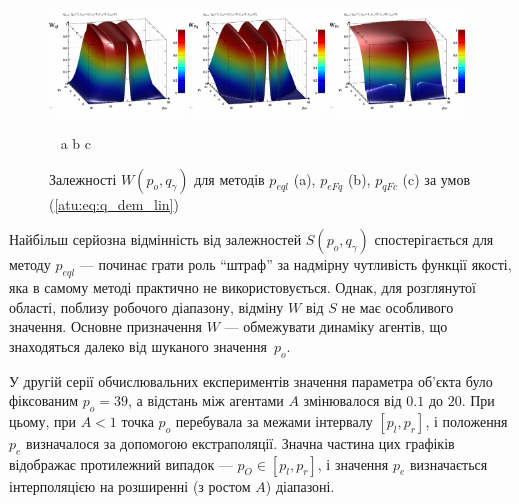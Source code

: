 \begin{figure}[htb!]
  \begin{center}
    \includegraphics[width=0.32\textwidth]{p/qls_pe-p_po_qg_Wql_lin.png}
    \hfill
    \includegraphics[width=0.32\textwidth]{p/qls_pe-p_po_qg_WFq_lin.png}
    \hfill
    \includegraphics[width=0.32\textwidth]{p/qls_pe-p_po_qg_WFc_lin.png}
  \end{center}
  \vspace{-1.0ex}
  \begin{center}
    ~ \hfill a \hfill\hfill b \hfill\hfill c \hfill ~
  \end{center}
  \vspace{-2.0ex}
  \caption{Залежності $W(p_o,q_\gamma)$ для методів $p_{eql}$ (a), $p_{eFq}$ (b), $p_{qFc}$ (c) за умов (\ref{atu:eq:q_dem_lin})}
  \label{atu:f:qsl_W_po_qg_lin}
\end{figure}

Найбільш серйозна відмінність від залежностей
$ S (p_o, q_\gamma) $ спостерігається для методу
$ p_{eql} $ --- починає грати роль ``штраф'' за надмірну
чутливість функції якості, яка в самому методі практично не
використовується. Однак, для розглянутої області, поблизу
робочого діапазону, відміну
$ W $ від
$ S $ не має особливого значення. Основне призначення
$ W $ --- обмежувати динаміку агентів, що знаходяться далеко від
шуканого значення~$p_o$.


У другій серії обчислювальних експериментів значення параметра об'єкта було
фіксованим $p_o = 39$, а відстань між агентами $A$ змінювалося від $0.1$
до $20$. При цьому, при $A <1$ точка $p_o$ перебувала за межами інтервалу
$[p_l, p_r]$, і положення $p_e$ визначалося за допомогою екстраполяції.
Значна частина цих графіків відображає протилежний випадок --- $p_O \in [p_l,p_r]$,
і значення $p_e$ визначається інтерполяцією на розширенні (з ростом $A$) діапазоні.

